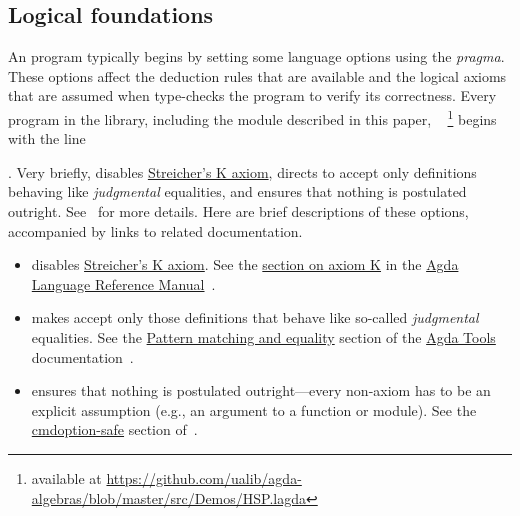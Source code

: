 \subsection{Logical foundations}

An \agda program typically begins by setting some language options
using the {\footnotesize {}} \emph{pragma}. These options affect
the deduction rules that are available and the logical axioms
that are assumed when \agda type-checks the program to verify its
correctness. Every \agda program in the \agdaalgebras library, including the
module \DemosHSPlagda described in this paper,%
\ifshort
~
\else
\footnote{available at
\url{https://github.com/ualib/agda-algebras/blob/master/src/Demos/HSP.lagda}}
\fi
begins with the line
\begin{code}[inline]%
\>[0]\AgdaSymbol{\{-\#}\AgdaSpace{}%
\AgdaSpace{}%
\AgdaSpace{}%
\AgdaSpace{}%
\AgdaSpace{}%
\AgdaSymbol{\#-\}}\<%
\end{code}
.
\ifshort
Very briefly,
 disables
\href{https://ncatlab.org/nlab/show/axiom+K+%28type+theory%29}{Streicher's K axiom},
 directs \agda to accept only definitions behaving like
{\it judgmental} equalities, and
 ensures that nothing is postulated outright.
See~\cite{agdaref-axiomk,agdaref-safeagda,agdatools-patternmatching} for more details.
\else
Here are brief descriptions of these options, accompanied by links to related documentation.
\begin{itemize}
\item
{} disables \href{https://ncatlab.org/nlab/show/axiom+K+%28type+theory%29}{Streicher's K axiom}.
See the \href{https://agda.readthedocs.io/en/v2.6.1/language/without-k.html}{section on axiom K} in
the \href{https://agda.readthedocs.io/en/v2.6.1.3/language}{Agda Language Reference Manual}~\cite{agdaref-axiomk}.
\item
{} makes \agda accept only those definitions that behave like so-called {\it judgmental} equalities.
See the \href{https://agda.readthedocs.io/en/v2.6.1/tools/command-line-options.html#pattern-matching-and-equality}%
{Pattern matching and equality} section of
the \href{https://agda.readthedocs.io/en/v2.6.1.3/tools/}{Agda Tools} documentation~\cite{agdatools-patternmatching}.
\item
{} ensures that nothing is postulated outright---every non-\mltt axiom has to be an explicit assumption (e.g., an argument to a function or module).
See the \href{https://agda.readthedocs.io/en/v2.6.1/tools/command-line-options.html#cmdoption-safe}{cmdoption-safe} section of~\cite{agdaref-safeagda}.
\end{itemize}
\fi

